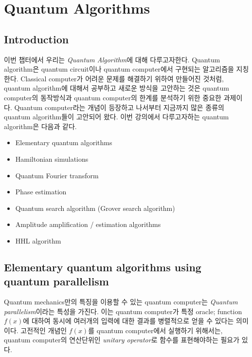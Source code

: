 \chapter{Quantum Algorithms}
\section{Introduction}
이번 챕터에서 우리는 \textit{Quantum Algorithm}에 대해 다루고자한다. Quantum algorithm은 quantum circuit이나 quantum computer에서 구현되는 알고리즘을 지칭한다.
Classical computer가 어려운 문제를 해결하기 위하여 만들어진 것처럼, quantum algorithm에 대해서 공부하고 새로운 방식을 고안하는 것은 quantum computer의 동작방식과 quantum computer의 한계를 분석하기 위한 중요한 과제이다. 
Quantum computer라는 개념이 등장하고 나서부터 지금까지 많은 종류의 quantum algorithm들이 고안되어 왔다. 이번 강의에서 다루고자하는 quantum algorithm은 다음과 같다. 
\begin{itemize}
  \item Elementary quantum algorithms
  \item Hamiltonian simulations
  \item Quantum Fourier transform
  \item Phase estimation
  \item Quantum search algorithm (Grover search algorithm)
  \item Amplitude amplification / estimation algorithms
  \item HHL algorithm
\end{itemize}

\section{Elementary quantum algorithms using quantum parallelism}

Quantum mechanics만의 특징을 이용할 수 있는 quantum computer는 \textit{Quantum parallelism}이라는 특성을 가진다. 이는 quantum computer가 특정 oracle; function $f(x)$에 대하여 동시에 여러개의 입력에 대한 결과를 병렬적으로 얻을 수 있다는 의미이다.
고전적인 개념인 $f(x)$를 quantum computer에서 실행하기 위해서는, quantum computer의 연산단위인 \textit{unitary operator}로 함수를 표현해야하는 필요가 있다.

